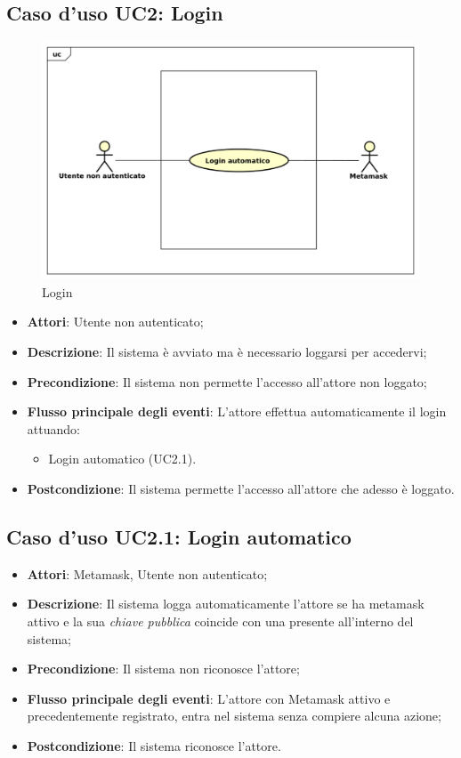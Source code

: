 \subsection{Caso d'uso \texorpdfstring{UC2}{UC2}: Login}
\begin{figure} [H]
	\centering
	\includegraphics[scale=0.45]{./img/UC2.pdf}
	\caption{Login}\label{}
\end{figure}
\begin{itemize}
	\item \textbf{Attori}: Utente non autenticato;
	\item \textbf{Descrizione}: Il sistema è avviato ma è necessario loggarsi per accedervi;
	\item \textbf{Precondizione}: Il sistema non permette l'accesso all'attore non loggato;
	\item \textbf{Flusso principale degli eventi}: L'attore effettua automaticamente il login attuando:
	\begin{itemize}
		\item Login automatico (UC2.1).
	\end{itemize}
	\item \textbf{Postcondizione}: Il sistema permette l'accesso all'attore che adesso è loggato.
\end{itemize}
\subsection{Caso d'uso \texorpdfstring{UC2.1}{UC2.1}: Login automatico}
\begin{itemize}
	\item \textbf{Attori}: Metamask, Utente non autenticato;
	\item \textbf{Descrizione}: Il sistema logga automaticamente l'attore se ha metamask attivo e la sua \emph{chiave pubblica} coincide con una presente all'interno del sistema;
	\item \textbf{Precondizione}: Il sistema non riconosce l'attore;
	\item \textbf{Flusso principale degli eventi}: L'attore con Metamask attivo e precedentemente registrato, entra nel sistema senza compiere alcuna azione;
	\item \textbf{Postcondizione}: Il sistema riconosce l'attore.
\end{itemize}
